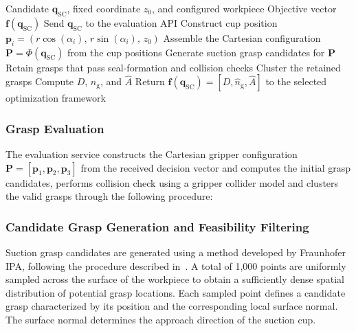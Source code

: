 \begin{algorithm}[H]
\caption{API evaluation of a multi-suction cup gripper candidate}
\label{alg:multi_sc_api_evaluation}
\begin{algorithmic}[1]
\Require Candidate $\mathbf{q}_{\mathrm{SC}}$, fixed coordinate $z_0$,
         and configured workpiece
\Ensure Objective vector $\mathbf{f}(\mathbf{q}_{\mathrm{SC}})$
\State Send $\mathbf{q}_{\mathrm{SC}}$ to the evaluation API
    \State Construct cup position
           $\mathbf{p}_i =
           \left(r\cos(\alpha_i),\,r\sin(\alpha_i),\,z_0\right)$
\EndFor
\State Assemble the Cartesian configuration
       $\mathbf{P}=\Phi(\mathbf{q}_{\mathrm{SC}})$ from the cup positions
\State Generate suction grasp candidates for $\mathbf{P}$
\State Retain grasps that pass seal-formation and collision checks
\State Cluster the retained grasps
\State Compute $D$, $\hat{n}_{\mathrm{g}}$, and $\hat{A}$
\State Return $\mathbf{f}(\mathbf{q}_{\mathrm{SC}})
       = [D,\hat{n}_{\mathrm{g}},\hat{A}]$
       to the selected optimization framework
\end{algorithmic}
\end{algorithm}

\subsubsection{Grasp Evaluation}
\label{sec:grasp_eval_sc}

The evaluation service constructs the Cartesian gripper configuration
$\mathbf{P}=[\mathbf{p}_1,\mathbf{p}_2,\mathbf{p}_3]$ from the received
decision vector and computes the initial grasp candidates, performs collision check using a gripper collider
model and clusters the valid grasps through the following procedure:

\subsubsection{Candidate Grasp Generation and Feasibility Filtering}

    Suction grasp candidates are generated using a method developed by Fraunhofer IPA, following the procedure described in~\cite{Kleeberger}. A total of
    1,000 points are uniformly sampled across the surface of the workpiece to obtain a sufficiently dense spatial distribution of potential grasp
    locations. Each sampled point defines a candidate grasp characterized by its position and the corresponding local surface normal. The surface normal
    determines the approach direction of the suction cup.

